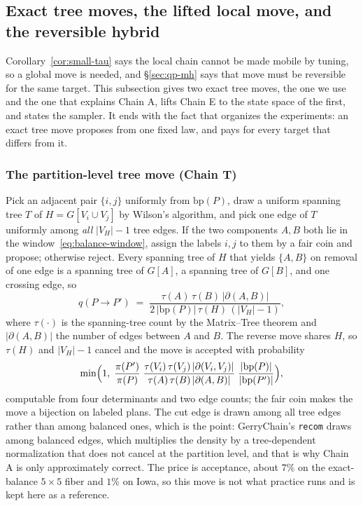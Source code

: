 \documentclass[11pt]{article}
\begin{document}
\subsection{Exact tree moves, the lifted local move, and the reversible hybrid}\label{sec:hybrid}

Corollary~\ref{cor:small-tau} says the local chain cannot be made
mobile by tuning, so a global move is needed, and \S\ref{sec:qp-mh}
says that move must be reversible for the same target. This
subsection gives two exact tree moves, the one we use and the one
that explains Chain A, lifts Chain E to the state space of the first,
and states the sampler. It ends with the fact that organizes the
experiments: an exact tree move proposes from one fixed law, and pays
for every target that differs from it.

\subsubsection{The partition-level tree move (Chain T)}\label{sec:tree-partition}

Pick an adjacent pair $\{i,j\}$ uniformly from $\mathrm{bp}(P)$, draw
a uniform spanning tree $T$ of $H = G[V_i \cup V_j]$ by Wilson's
algorithm, and pick one edge of $T$ uniformly among \emph{all}
$|V_H| - 1$ tree edges. If the two components $A, B$ both lie in the
window~\eqref{eq:balance-window}, assign the labels $i, j$ to them by
a fair coin and propose; otherwise reject. Every spanning tree of $H$
that yields $\{A, B\}$ on removal of one edge is a spanning tree of
$G[A]$, a spanning tree of $G[B]$, and one crossing edge, so
\[
  q(P \to P') \;=\;
  \frac{\tau(A)\,\tau(B)\,|\partial(A,B)|}
       {2\,|\mathrm{bp}(P)|\,\tau(H)\,(|V_H| - 1)},
\]
where $\tau(\cdot)$ is the spanning-tree count by the Matrix--Tree
theorem and $|\partial(A,B)|$ the number of edges between $A$ and $B$.
The reverse move shares $H$, so $\tau(H)$ and $|V_H| - 1$ cancel and
the move is accepted with probability
\[
  \min\Bigl(1,\;
  \frac{\pi(P')}{\pi(P)}\;
  \frac{\tau(V_i)\,\tau(V_j)\,|\partial(V_i,V_j)|}
       {\tau(A)\,\tau(B)\,|\partial(A,B)|}\;
  \frac{|\mathrm{bp}(P)|}{|\mathrm{bp}(P')|}\Bigr),
\]
computable from four determinants and two edge counts; the fair coin
makes the move a bijection on labeled plans. The cut edge is drawn
among all tree edges rather than among balanced ones, which is the
point: GerryChain's \texttt{recom} draws among balanced edges, which
multiplies the density by a tree-dependent normalization that does
not cancel at the partition level, and that is why Chain A is only
approximately correct. The price is acceptance, about $7\%$ on the
exact-balance $5 \times 5$ fiber and $1\%$ on Iowa, so this move is
not what practice runs and is kept here as a reference.
\end{document}
